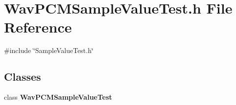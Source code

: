 \section{Wav\+P\+C\+M\+Sample\+Value\+Test.\+h File Reference}
\label{WavPCMSampleValueTest_8h}
{\ttfamily \#include \char`\"{}Sample\+Value\+Test.\+h\char`\"{}}\newline
\subsection*{Classes}
\begin{DoxyCompactItemize}
\item 
class \textbf{ Wav\+P\+C\+M\+Sample\+Value\+Test}
\end{DoxyCompactItemize}
